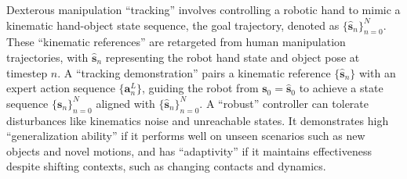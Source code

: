 {%
Dexterous manipulation ``tracking'' involves controlling a robotic hand to mimic a kinematic hand-object state sequence, the goal trajectory, denoted as $\{\hat{\mathbf{s}}_n\}_{n=0}^N$. These ``kinematic references''  are retargeted from human manipulation trajectories, with $\hat{\mathbf{s}}_n$ representing the robot hand state and object pose at timestep $n$. A ``tracking demonstration'' pairs a kinematic reference $\{\hat{\mathbf{s}}_n\}$ with an expert action sequence $\{\mathbf{a}_n^L\}$, guiding the robot from $\mathbf{s}_0=\hat{\mathbf{s}}_0$ to achieve a state sequence $\{\mathbf{s}_n\}_{n=0}^N$ aligned with $\{\hat{\mathbf{s}}_n\}_{n=0}^N$. A ``robust'' controller can tolerate disturbances like kinematics noise and unreachable states. It demonstrates high ``generalization ability'' if it performs well on unseen scenarios such as new objects and novel motions, and has ``adaptivity'' if it maintains effectiveness despite shifting contexts, such as changing contacts and dynamics.
}



